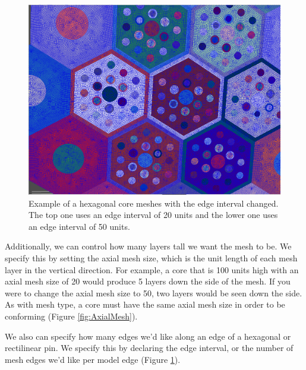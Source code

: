 \begin{figure}[h]
\begin{minipage}{.45\textwidth}
	\includegraphics[width=0.95\linewidth]{Images/edge-interval-50.png}

	\caption{Example of a hexagonal core meshes with the edge interval changed.  The top one uses an edge interval of 20 units and the lower one uses an edge interval of 50 units.}
	\label{fig:EdgeInterval}
\end{minipage}
\end{figure}

Additionally, we can control how many layers tall we want the mesh to be.  We specify this by setting the axial mesh size, which is the unit length of each mesh layer in the vertical direction.  For example, a core that is 100 units high with an axial mesh size of 20 would produce 5 layers down the side of the mesh.  If you were to change the axial mesh size to 50, two layers would be seen down the side.  As with mesh type, a core must have the same axial mesh size in order to be conforming (Figure \ref{fig:AxialMesh}).

We also can specify how many edges we'd like along an edge of a hexagonal or rectilinear pin.  We specify this by declaring the edge interval, or the number of mesh edges we'd like per model edge (Figure \ref{fig:EdgeInterval}).


